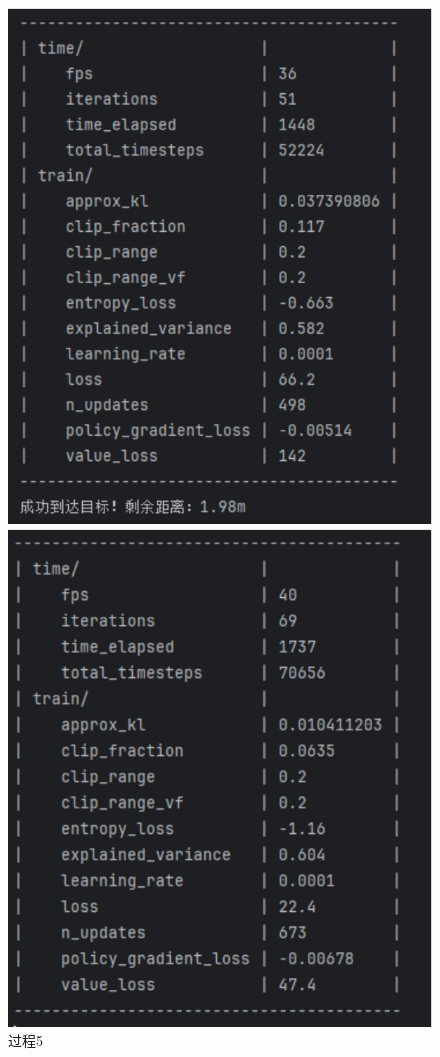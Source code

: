 \begin{figure}[H]
    \begin{minipage}{0.24\textwidth}
        \centering
        \includegraphics[width=\textwidth]{images/training5.pdf}
        \caption{过程5}
    \end{minipage}%
    \begin{minipage}{0.24\textwidth}
        \centering
        \includegraphics[width=\textwidth]{images/training6.pdf}

\end{minipage}
\end{figure}
